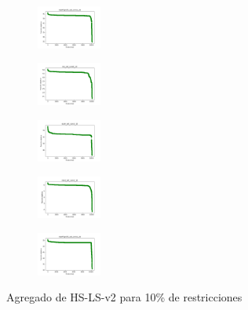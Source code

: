 \begin{figure}[H]
\begin{subfigure}
        \centering
        \includegraphics[width=0.234\textwidth]{img/HS-LS-v2/newthyroid_set_const_10_49258669_cost.png}
    \end{subfigure}
    \hfill
    \begin{subfigure}
        \centering
        \includegraphics[width=0.234\textwidth]{img/HS-LS-v2/iris_set_const_10_3773969821_cost.png}
    \end{subfigure}
    \hfill
    \begin{subfigure}
        \centering
        \includegraphics[width=0.234\textwidth]{img/HS-LS-v2/ecoli_set_const_10_3773969821_cost.png}
    \end{subfigure}
    \hfill
    \begin{subfigure}
        \centering
        \includegraphics[width=0.234\textwidth]{img/HS-LS-v2/rand_set_const_10_3773969821_cost.png}
    \end{subfigure}
    \hfill
    \begin{subfigure}
        \centering
        \includegraphics[width=0.234\textwidth]{img/HS-LS-v2/newthyroid_set_const_10_3773969821_cost.png}
    \end{subfigure}
    \caption{Agregado de HS-LS-v2 para 10\% de restricciones}
\end{figure}

